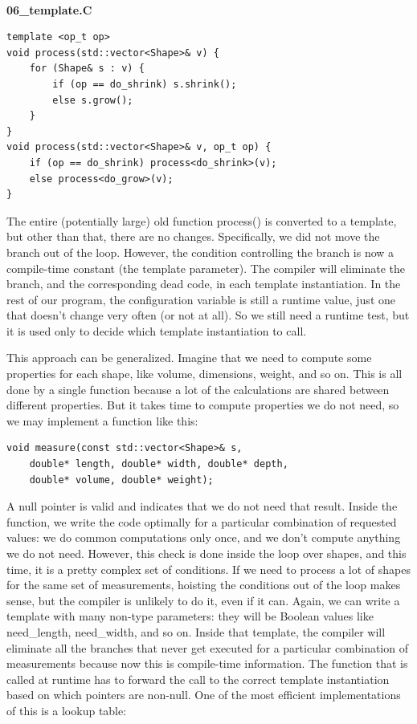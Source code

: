 \hspace*{\fill} \\ %
\noindent
\textbf{06\_template.C}
\begin{lstlisting}[style=styleCXX]
template <op_t op>
void process(std::vector<Shape>& v) {
	for (Shape& s : v) {
		if (op == do_shrink) s.shrink();
		else s.grow();
	}
}
void process(std::vector<Shape>& v, op_t op) {
	if (op == do_shrink) process<do_shrink>(v);
	else process<do_grow>(v);
}
\end{lstlisting}

The entire (potentially large) old function process() is converted to a template, but other than that, there are no changes. Specifically, we did not move the branch out of the loop. However, the condition controlling the branch is now a compile-time constant (the template parameter). The compiler will eliminate the branch, and the corresponding dead code, in each template instantiation. In the rest of our program, the configuration variable is still a runtime value, just one that doesn't change very often (or not at all). So we still need a runtime test, but it is used only to decide which template instantiation to call.

This approach can be generalized. Imagine that we need to compute some properties for each shape, like volume, dimensions, weight, and so on. This is all done by a single function because a lot of the calculations are shared between different properties. But it takes time to compute properties we do not need, so we may implement a function like this:

\begin{lstlisting}[style=styleCXX]
void measure(const std::vector<Shape>& s,
	double* length, double* width, double* depth,
	double* volume, double* weight);
\end{lstlisting}

A null pointer is valid and indicates that we do not need that result. Inside the function, we write the code optimally for a particular combination of requested values: we do common computations only once, and we don't compute anything we do not need. However, this check is done inside the loop over shapes, and this time, it is a pretty complex set of conditions. If we need to process a lot of shapes for the same set of measurements, hoisting the conditions out of the loop makes sense, but the compiler is unlikely to do it, even if it can. Again, we can write a template with many non-type parameters: they will be Boolean values like need\_length, need\_width, and so on. Inside that template, the compiler will eliminate all the branches that never get executed for a particular combination of measurements because now this is compile-time information. The function that is called at runtime has to forward the call to the correct template instantiation based on which pointers are non-null. One of the most efficient implementations of this is a lookup table:

